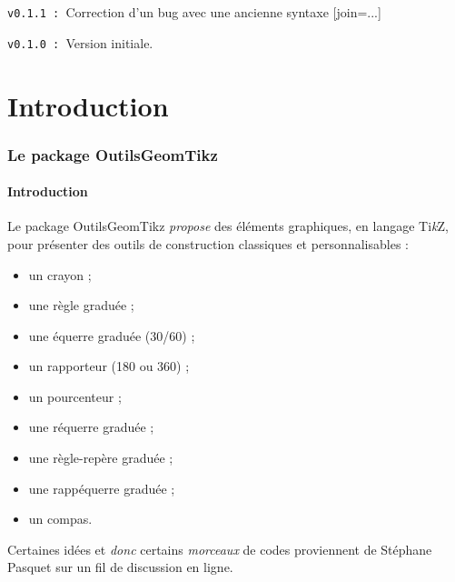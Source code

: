 \documentclass[french,a4paper,11pt]{article}
\providecommand\tikzlogo{Ti\textit{k}Z}
\let\TikZ\tikzlogo
\begin{document}
\verb|v0.1.1 : |Correction d'un bug avec une ancienne syntaxe \textsf{[join=...]}

\verb|v0.1.0 : |Version initiale.

\vspace{1cm}

\newpage

\part{Introduction}

\section{Le package OutilsGeomTikz}

\subsection{Introduction}

\begin{noteblock}
Le package \textsf{OutilsGeomTikz} \textit{propose} des éléments graphiques, en langage \TikZ, pour présenter des outils de construction classiques et personnalisables :

\begin{itemize}
	\item un crayon ;
	\item une règle graduée ;
	\item une équerre graduée (30/60) ;
	\item un rapporteur (180 ou 360) ;
	\item un pourcenteur ;
	\item une réquerre graduée ;
	\item une \og règle-repère \fg{} graduée ;
	\item une \og rappéquerre \fg{} graduée ;
	\item un compas.
\end{itemize}
\vspace*{-\baselineskip}\leavevmode
\end{noteblock}

\begin{cautionblock}
Certaines idées et \textit{donc} certains \textit{morceaux} de codes proviennent de Stéphane Pasquet\footnotemark{} sur un fil de discussion en ligne.
\end{cautionblock}
\end{document}
